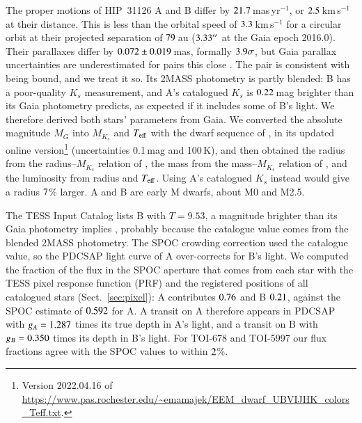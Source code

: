\documentclass[twocolumn,numberedappendix,appendixfloats]{openjournal}
\begin{document}
The proper motions of HIP~31126 A and B differ by
$21.7$\,mas\,yr$^{-1}$, or $2.5$\,km\,s$^{-1}$ at their distance. This is
less than the orbital speed of $3.3$\,km\,s$^{-1}$ for a circular orbit at
their projected separation of $79$\,au ($3.33''$ at the Gaia epoch 2016.0). Their
parallaxes differ by $0.072 \pm 0.019$\,mas, formally $3.9\sigma$, but
Gaia parallax uncertainties are underestimated for pairs this close
\citep{elbadry2021}. The
pair is consistent with being bound, and we treat it so. Its 2MASS photometry
is partly blended: B has a poor-quality $K_s$ measurement, and A's catalogued
$K_s$ is $0.22$\,mag brighter than its Gaia photometry predicts, as
expected if it includes some of B's light. We therefore derived both stars'
parameters from Gaia. We converted the absolute magnitude $M_G$ into $M_{K_s}$
and $T_{\rm eff}$ with the dwarf sequence of \citet{pecaut2013}, in its updated
online version\footnote{Version 2022.04.16 of
\url{https://www.pas.rochester.edu/~emamajek/EEM_dwarf_UBVIJHK_colors_Teff.txt}.}
(uncertainties 0.1\,mag and 100\,K), and then obtained the radius from the radius--$M_{K_s}$
relation of \citet{mann2015}, the mass from the mass--$M_{K_s}$ relation of
\citet{mann2019}, and the luminosity from radius and $T_{\rm eff}$. Using A's catalogued $K_s$ instead would give a radius
$7$\% larger. A and B are early M dwarfs, about M0 and M2.5.

The TESS Input Catalog lists B with $T = 9.53$, a magnitude brighter than its
Gaia photometry implies \citep[$T = \TmagHpB$ from the relations
of][]{stassun2019}, probably because the catalogue value comes from the
blended 2MASS photometry. The SPOC crowding correction used the catalogue
value, so the PDCSAP light curve of A over-corrects for B's light. We computed
the fraction of the flux in the SPOC aperture that comes from each star with
the TESS pixel response function (PRF) and the registered positions of all
catalogued stars (Sect.~\ref{sec:pixel}): A contributes $0.76$ and B $0.21$,
against the SPOC estimate of $0.592$ for A. A transit on A therefore appears
in PDCSAP with $g_A = 1.287$ times its true depth in A's light, and a transit on
B with $g_B = 0.350$ times its depth in B's light. For TOI-678 and TOI-5997 our
flux fractions agree with the SPOC values to within $2$\%.
\end{document}
